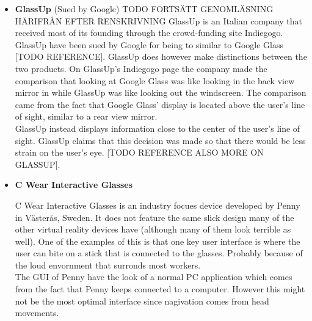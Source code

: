 \begin{itemize}
Unlike Google Glass, Recon Jet's display is located below the user's line of sight, as seen in Figure \ref{imagesSimilarProducts}. Recon Jet's target audience, athletes, are used to having their information below line of sight. For instance a bike may have dashboard mounted to the handbar, or an athlete might be using a watch to check the time. Google wanted the Google Glass to be available to the user when the user wanted to use Google Glass, and to stay out of the way when the user did not want to use Google Glass. The location of the display and the brightness of the display indicates that the Recon Jet is meant to be used while the athlete is working out and not more regularly.\\

\item \textbf{GlassUp}\cite{glassUp} (Sued by Google)
TODO FORTSÄTT GENOMLÄSNING HÄRIFRÅN EFTER RENSKRIVNING
GlassUp is an Italian company that received most of its founding through the crowd-funding site Indiegogo.\cite{glassUpIndiegogo} GlassUp have been sued by Google for being to similar to Google Glass [TODO REFERENCE]. GlassUp does however make distinctions between the two products. On GlassUp's Indiegogo page the company made the comparison that looking at Google Glass was like looking in the back view mirror in while GlassUp was like looking out the windscreen. The comparison came from the fact that Google Glass' display is located above the user's line of sight, similar to a rear view mirror.\\

GlassUp instead displays information close to the center of the user's line of sight. GlassUp claims that this decision was made so that there would be less strain on the user's eye. [TODO REFERENCE ALSO MORE ON GLASSUP].\\

\item \textbf{C Wear Interactive Glasses}\cite{penny}

C Wear Interactive Glasses is an industry focues device developed by Penny in V{\"a}ster{\aa}s, Sweden. It does not feature the same slick design many of the other virtual reality devices have (although many of them look terrible as well). One of the examples of this is that one key user interface is where the user can bite on a stick that is connected to the glasses. Probably because of the loud envornment that surronds most workers.\\

The GUI of Penny have the look of a normal PC application which comes from the fact that Penny keeps connected to a computer. However this might not be the most optimal interface since nagivation comes from head movements.
\end{itemize}
